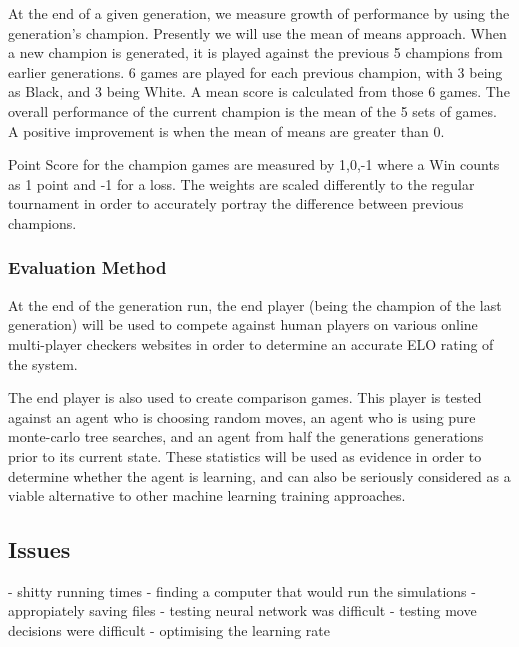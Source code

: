 \documentclass[12pt,a4paper]{article}
\begin{document}
        At the end of a given generation, we measure growth of performance by using the generation's champion. Presently we will use the mean of means approach. When a new champion is generated, it is played against the previous 5 champions from earlier generations. 6 games are played for each previous champion, with 3 being as Black, and 3 being White. A mean score is calculated from those 6 games. The overall performance of the current champion is the mean of the 5 sets of games. A positive improvement is when the mean of means are greater than 0. 

        Point Score for the champion games are measured by {1,0,-1} where a Win counts as 1 point and -1 for a loss. The weights are scaled differently to the regular tournament in order to accurately portray the difference between previous champions.
    
        \subsubsection*{Evaluation Method}
    
        At the end of the generation run, the end player (being the champion of the last generation) will be used to compete against human players on various online multi-player checkers websites in order to determine an accurate ELO rating of the system.
    
        The end player is also used to create comparison games. This player is tested against an agent who is choosing random moves, an agent who is using pure monte-carlo tree searches, and an agent from half the generations generations prior to its current state. These statistics will be used as evidence in order to determine whether the agent is learning, and can also be seriously considered as a viable alternative to other machine learning training approaches.
    
    \subsection{Issues}
        - shitty running times
        - finding a computer that would run the simulations
        - appropiately saving files
        - testing neural network was difficult
        - testing move decisions were difficult
        - optimising the learning rate
\end{document}
